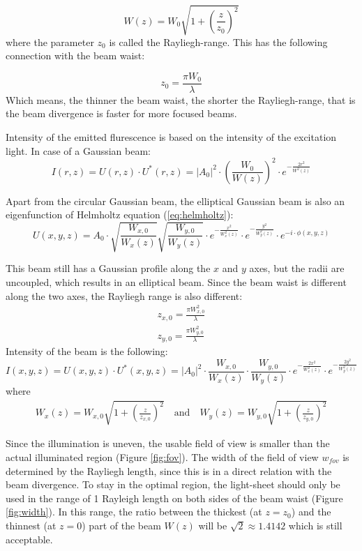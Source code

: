 \documentclass{tdk_style}
\begin{document}
\begin{equation}
	W(z) = W_0\sqrt{1+\left( \frac{z}{z_0} \right)^2}
\end{equation}
where the parameter $z_0$ is called the Rayliegh-range. This has the following connection with the beam waist:

\begin{equation}
	z_0 = \frac{\pi W_0}{\lambda}
\end{equation}
Which means, the thinner the beam waist, the shorter the Rayliegh-range, that is the beam divergence is faster for more focused beams.

Intensity of the emitted flurescence is based on the intensity of the excitation light. In case of a Gaussian beam:
\begin{equation}
	I(r,z) = U(r,z)\cdot U^*(r,z) = |A_0|^2 \cdot \left( \frac{W_0}{W(z)}\right)^2 \cdot e^{-\frac{2r^2}{W^2(z)}}
\end{equation}

Apart from the circular Gaussian beam, the elliptical Gaussian beam is also an eigenfunction of Helmholtz equation (\ref{eq:helmholtz}):
\begin{equation}
	U(x,y,z) = A_0 \cdot \sqrt{\frac{W_{x,0}}{W_x(z)}} \sqrt{\frac{W_{y,0}}{W_y(z)}} \cdot e^{-\frac{x^2}{W_x^2(z)}} \cdot e^{-\frac{y^2}{W_y^2(z)}} \cdot e^{-i\cdot \phi(x,y,z)}
\end{equation}

This beam still has a Gaussian profile along the $x$ and $y$ axes, but the radii are uncoupled, which results in an elliptical beam. Since the beam waist is different along the two axes, the Rayliegh range is also different:
\begin{align}
	z_{x,0} = \frac{\pi W_{x,0}^2}{\lambda} \\
	z_{y,0} = \frac{\pi W_{y,0}^2}{\lambda}
\end{align}
Intensity of the beam is the following:
\begin{equation}
	I(x,y,z) = U(x,y,z)\cdot U^*(x,y,z) = |A_0|^2 \cdot \frac{W_{x,0}}{W_x(z)} \cdot \frac{W_{y,0}}{W_y(z)} \cdot e^{-\frac{2x^2}{W_x^2(z)}} \cdot e^{-\frac{2y^2}{W_y^2(z)}}
\end{equation}
where
\begin{align}
W_x(z) = W_{x,0}\sqrt{1+\left( \frac{z}{z_{x,0}} \right)^2}\mathrm{\quad and \quad } W_y(z) = W_{y,0}\sqrt{1+\left( \frac{z}{z_{y,0}} \right)^2}
\end{align}

Since the illumination is uneven, the usable field of view is smaller than the actual illuminated region (Figure \ref{fig:fov}). The width of the field of view $w_{fov}$ is determined by the Rayliegh length, since this is in a direct relation with the beam divergence. To stay in the optimal region, the light-sheet should only be used in the range of 1 Rayleigh length on both sides of the beam waist (Figure \ref{fig:width}). In this range, the ratio between the thickest (at $z=z_0$) and the thinnest (at $z=0$) part of the beam $W(z)$ will be $\sqrt{2}\approx 1.4142$ which is still acceptable.
\end{document}
